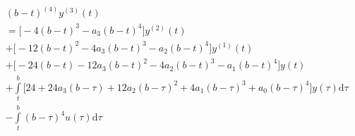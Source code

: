 \documentclass[letterpaper%
, twoside%
, 12pt%
,memoire%
, english%
,creativecommons,hyperref%
]{thETS}
\begin{document}
\begin{equation}\label{eqn:A6}
\begin{split}
	&(b-t)^{(4)}y^{(3)}(t)\\
	&=\bigg[-4(b-t)^{3} - a_3(b-t)^{4}\bigg]y^{(2)}(t)\\
	&+\bigg[-12(b-t)^{2}-4a_3(b-t)^{3}-a_2(b-t)^{4}\bigg]y^{(1)}(t)\\
	&+\bigg[-24(b-t)-12a_3(b-t)^{2}-4a_2(b-t)^{3}-a_1(b-t)^{4}\bigg]y(t)\\
	&+\int\limits_{t}^{b}\bigg[24+24a_3(b-\tau)+12a_2(b-\tau)^{2}+4a_1(b-\tau)^{3}+a_0(b-\tau)^{4}\bigg]y(\tau)\mathrm{d}\tau\\
	&-\int\limits_{t}^{b}(b-\tau)^{4}u(\tau)\mathrm{d}\tau
\end{split}
\end{equation}

%
%
%
%
%
\end{document}
